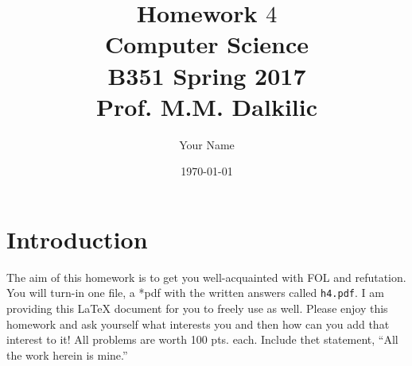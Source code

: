 \documentclass{article}
\begin{document}
\title{Homework $4$\\ Computer Science \\ B351 Spring 2017\\ Prof. M.M. Dalkilic}         %
\author{Your Name}        %
\date{\today}          %
\maketitle


\makeatother     %




\pagestyle{plain}

\section*{Introduction}
The aim of this homework is to get you well-acquainted with FOL and refutation.  You will turn-in one file, a *pdf with the written answers called \texttt{h4.pdf}.   I am providing this \LaTeX{} document for you to freely use as well.  Please enjoy this homework and ask yourself what interests you and then how can you add that interest to it!  All problems are worth 100 pts. each.  Include thet statement, ``All the work herein is mine.''
\newpage
\end{document}

